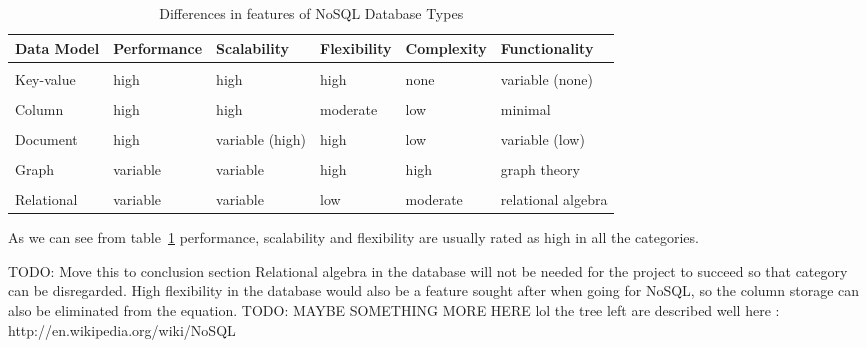 \begin{table}[H]
\centering
\begin{adjustwidth}{-2cm}{}
\begin{tabularx}{1.3\textwidth}{  l l l l l l }
  \textbf{Data Model} & \textbf{Performance} & \textbf{Scalability} & \textbf{Flexibility} & \textbf{Complexity} & \textbf{Functionality}\\
  \hline \\ [-1.5ex]
  Key-value & high      & high              & high      & none      & variable (none)\\
  \hline \\ [-1.5ex]
  Column    & high      & high              & moderate  & low       & minimal \\
  \hline \\ [-1.5ex]
  Document  & high      & variable (high)   & high      & low       & variable (low)\\
  \hline \\ [-1.5ex]
  Graph     & variable  & variable          & high      & high      & graph theory \\
  \hline \\ [-1.5ex]
  Relational & variable & variable          & low       & moderate  & relational algebra\\
\end{tabularx}
\end{adjustwidth}
\caption{Differences in features of NoSQL Database Types}
\label{table:nosql-calssifications}
\end{table}
As we can see from table~\ref{table:nosql-calssifications} performance, scalability and flexibility are usually rated as high in all the categories.

TODO: Move this to conclusion section
Relational algebra in the database will not be needed for the project to succeed so that category can be disregarded. High flexibility in the database would also be a feature sought after when going for NoSQL, so the column storage can also be eliminated from the equation. TODO: MAYBE SOMETHING MORE HERE lol the tree left are described well here : http://en.wikipedia.org/wiki/NoSQL
\cite{nosql-databases, nosql-article}


